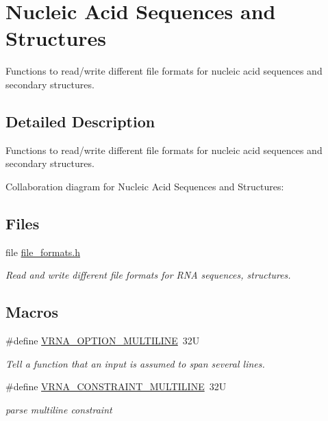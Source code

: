 \hypertarget{group__file__formats}{}\section{Nucleic Acid Sequences and Structures}
\label{group__file__formats}


Functions to read/write different file formats for nucleic acid sequences and secondary structures.  




\subsection{Detailed Description}
Functions to read/write different file formats for nucleic acid sequences and secondary structures. 

Collaboration diagram for Nucleic Acid Sequences and Structures\+:
\subsection*{Files}
\begin{DoxyCompactItemize}
\item 
file \mbox{\hyperlink{io_2file__formats_8h}{file\+\_\+formats.\+h}}
\begin{DoxyCompactList}\small\item\em Read and write different file formats for R\+NA sequences, structures. \end{DoxyCompactList}\end{DoxyCompactItemize}
\subsection*{Macros}
\begin{DoxyCompactItemize}
\item 
\#define \mbox{\hyperlink{group__file__formats_gabec89c09874528c6cb73140a4c3d86d7}{V\+R\+N\+A\+\_\+\+O\+P\+T\+I\+O\+N\+\_\+\+M\+U\+L\+T\+I\+L\+I\+NE}}~32U
\begin{DoxyCompactList}\small\item\em Tell a function that an input is assumed to span several lines. \end{DoxyCompactList}\item 
\#define \mbox{\hyperlink{group__file__formats_ga7d725ef525b29891abef3f1ed42599a4}{V\+R\+N\+A\+\_\+\+C\+O\+N\+S\+T\+R\+A\+I\+N\+T\+\_\+\+M\+U\+L\+T\+I\+L\+I\+NE}}~32U
\begin{DoxyCompactList}\small\item\em parse multiline constraint \end{DoxyCompactList}\end{DoxyCompactItemize}
